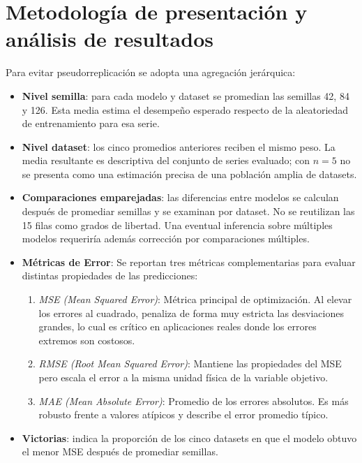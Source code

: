 \section{Metodología de presentación y análisis de resultados}
\label{sec:metodologia-analisis-resultados}

Para evitar pseudorreplicación se adopta una agregación jerárquica:

\begin{itemize}
    \item \textbf{Nivel semilla}: para cada modelo y dataset se promedian las semillas 42, 84 y 126. Esta media estima el desempeño esperado respecto de la aleatoriedad de entrenamiento para esa serie.
    \item \textbf{Nivel dataset}: los cinco promedios anteriores reciben el mismo peso. La media resultante es descriptiva del conjunto de series evaluado; con $n=5$ no se presenta como una estimación precisa de una población amplia de datasets.
    \item \textbf{Comparaciones emparejadas}: las diferencias entre modelos se calculan después de promediar semillas y se examinan por dataset. No se reutilizan las 15 filas como grados de libertad. Una eventual inferencia sobre múltiples modelos requeriría además corrección por comparaciones múltiples.
	
	\item \textbf{Métricas de Error}: Se reportan tres métricas complementarias para evaluar distintas propiedades de las predicciones:
	\begin{enumerate}
		\item \emph{MSE (Mean Squared Error)}: Métrica principal de optimización. Al elevar los errores al cuadrado, penaliza de forma muy estricta las desviaciones grandes, lo cual es crítico en aplicaciones reales donde los errores extremos son costosos.
		\item \emph{RMSE (Root Mean Squared Error)}: Mantiene las propiedades del MSE pero escala el error a la misma unidad física de la variable objetivo.
		\item \emph{MAE (Mean Absolute Error)}: Promedio de los errores absolutos. Es más robusto frente a valores atípicos y describe el error promedio típico.
	\end{enumerate}
	
    \item \textbf{Victorias}: indica la proporción de los cinco datasets en que el modelo obtuvo el menor MSE después de promediar semillas.
\end{itemize}

